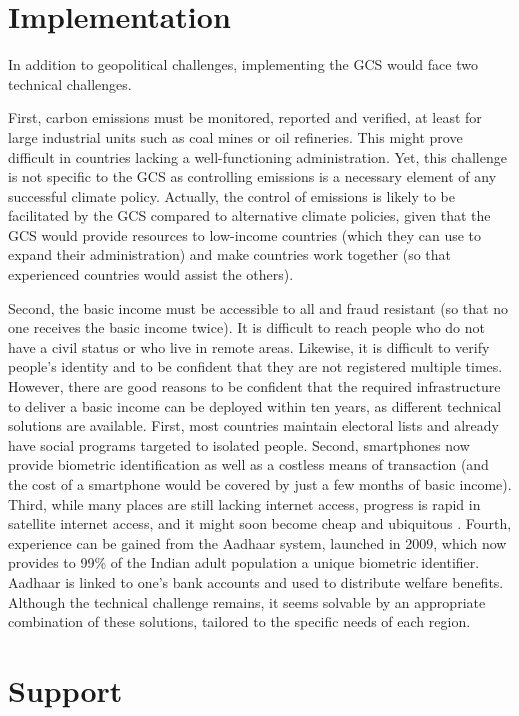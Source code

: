 \documentclass[12pt,english]{article}
\begin{document}
\section{Implementation}\label{sec:implementation}

In addition to geopolitical challenges, implementing the GCS would face two technical challenges. 

First, carbon emissions must be monitored, reported and verified, at least for large industrial units such as coal mines or oil refineries. This might prove difficult in countries lacking a well-functioning administration. Yet, this challenge is not specific to the GCS as controlling emissions is a necessary element of any successful climate policy. Actually, the control of emissions is likely to be facilitated by the GCS compared to alternative climate policies, given that the GCS would provide resources to low-income countries (which they can use to expand their administration) and make countries work together (so that experienced countries would assist the others). 

Second, the basic income must be accessible to all and fraud resistant (so that no one receives the basic income twice). It is difficult to reach people who do not have a civil status or who live in remote areas. Likewise, it is difficult to verify people's identity and to be confident that they are not registered multiple times. However, there are good reasons to be confident that the required infrastructure to deliver a basic income can be deployed within ten years, as different technical solutions are available. First, most countries maintain electoral lists and already have social programs targeted to isolated people. Second, smartphones now provide biometric identification as well as a costless means of transaction (and the cost of a smartphone would be covered by just a few months of basic income). Third, while many places are still lacking internet access, progress is rapid in satellite internet access, and it might soon become cheap and ubiquitous \citep{hanson_satellite_2016}. Fourth, experience can be gained from the Aadhaar system, launched in 2009, which now provides to 99\% of the Indian adult population a unique biometric identifier. Aadhaar is linked to one's bank accounts and used to distribute welfare benefits. Although the technical challenge remains, it seems solvable by an appropriate combination of these solutions, tailored to the specific needs of each region. 

\section{Support}\label{sec:support}
\end{document}
